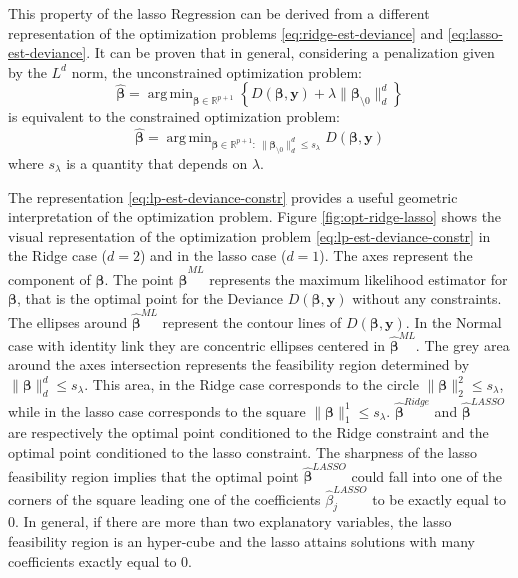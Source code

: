 \documentclass[a4paper, twoside, openright, 12pt]{report}
\DeclareMathOperator*{\argmin}{arg\,min}  %
\theoremstyle{definition}
\theoremstyle{definition}
\theoremstyle{definition}
\theoremstyle{remark}
\begin{document}
This property of the \ac{lasso} Regression can be derived from a different representation of the optimization problems \eqref{eq:ridge-est-deviance} and \eqref{eq:lasso-est-deviance}. It can be proven that in general, considering a penalization given by the \(L^d\) norm, the unconstrained optimization problem:
\begin{equation}
\label{eq:ld-est-deviance}
\hat{\boldsymbol{\beta}} = \argmin_{\boldsymbol{\beta}\in\mathbb{R}^{p+1}}{\left\{D(\boldsymbol{\beta}, \boldsymbol{y}) + \lambda \|\boldsymbol{\beta}_{\setminus0}\|_d^d\right\}}
\end{equation}
is equivalent to the constrained optimization problem:
\begin{equation}
\label{eq:lp-est-deviance-constr}
\hat{\boldsymbol{\beta}} = \argmin_{\boldsymbol{\beta}\in\mathbb{R}^{p+1}:\  \|\boldsymbol{\beta}_{\setminus0}\|_d^d \le s_{\lambda}}{ D(\boldsymbol{\beta}, \boldsymbol{y}) }
\end{equation}
where \(s_{\lambda}\) is a quantity that depends on \(\lambda\).

The representation \eqref{eq:lp-est-deviance-constr} provides a useful geometric interpretation of the optimization problem. Figure \ref{fig:opt-ridge-lasso} shows the visual representation of the optimization problem \eqref{eq:lp-est-deviance-constr} in the Ridge case (\(d=2\)) and in the \ac{lasso} case (\(d=1\)). The axes represent the component of \(\boldsymbol{\beta}\). The point \(\hat{\boldsymbol{\beta}}^{ML}\) represents the maximum likelihood estimator for \(\boldsymbol{\beta}\), that is the optimal point for the Deviance \(D(\boldsymbol{\beta}, \boldsymbol{y})\) without any constraints. The ellipses around \(\hat{\boldsymbol{\beta}}^{ML}\) represent the contour lines of \(D(\boldsymbol{\beta}, \boldsymbol{y})\). In the Normal case with identity link they are concentric ellipses centered in \(\hat{\boldsymbol{\beta}}^{ML}\). The grey area around the axes intersection represents the feasibility region determined by \(\|\boldsymbol{\beta}\|_d^d \le s_\lambda\). This area, in the Ridge case corresponds to the circle \(\|\boldsymbol{\beta}\|_2^2 \le s_\lambda\), while in the \ac{lasso} case corresponds to the square \(\|\boldsymbol{\beta}\|_1^1 \le s_\lambda\). \(\hat{\boldsymbol{\beta}}^{Ridge}\) and \(\hat{\boldsymbol{\beta}}^{LASSO}\) are respectively the optimal point conditioned to the Ridge constraint and the optimal point conditioned to the \ac{lasso} constraint. The sharpness of the \ac{lasso} feasibility region implies that the optimal point \(\hat{\boldsymbol{\beta}}^{LASSO}\) could fall into one of the corners of the square leading one of the coefficients \(\hat{\beta}_j^{LASSO}\) to be exactly equal to \(0\). In general, if there are more than two explanatory variables, the \ac{lasso} feasibility region is an hyper-cube and the \ac{lasso} attains solutions with many coefficients exactly equal to \(0\).
\end{document}
